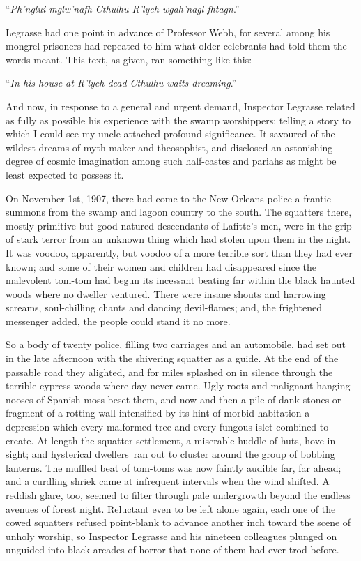 ``\emph{Ph'nglui mglw'nafh Cthulhu R'lyeh wgah'nagl fhtagn}.''

Legrasse had one point in advance of Professor Webb, for several among
his mongrel prisoners had repeated to him what older celebrants had told
them the words meant. This text, as given, ran something like this:

``\emph{In his house at R'lyeh dead Cthulhu waits dreaming}.''

And now, in response to a general and urgent demand, Inspector Legrasse
related as fully as possible his experience with the swamp worshippers;
telling a story to which I could see my uncle attached profound
significance. It savoured of the wildest dreams of myth-maker and
theosophist, and disclosed an astonishing degree of cosmic imagination
among such half-castes and pariahs as might be least expected to possess
it.

\pagebreak

On November 1st, 1907, there had come to the New Orleans police a
frantic summons from the swamp and lagoon country to the south. The
squatters there, mostly primitive but good-natured descendants of
Lafitte's men, were in the grip of stark terror from an unknown thing
which had stolen upon them in the night. It was voodoo, apparently, but
voodoo of a more terrible sort than they had ever known; and some of
their women and children had disappeared since the malevolent tom-tom
had begun its incessant beating far within the black haunted woods where
no dweller ventured. There were insane shouts and harrowing screams,
soul-chilling chants and dancing devil-flames; and, the frightened
messenger added, the people could stand it no more.

So a body of twenty police, filling two carriages and an automobile, had
set out in the late afternoon with the shivering squatter as a guide. At
the end of the passable road they alighted, and for miles splashed on in
silence through the terrible cypress woods where day never came. Ugly
roots and malignant hanging nooses of Spanish moss beset them, and now
and then a pile of dank stones or fragment of a rotting wall intensified
by its hint of morbid habitation a depression which every malformed tree
and every fungous islet combined to create. At length the squatter
settlement, a miserable huddle of huts, hove in sight; and hysterical
dwellers\est\ ran out to cluster around the group of bobbing lanterns. The
muffled beat of tom-toms was now faintly audible far, far ahead; and a
curdling shriek came at infrequent intervals when the wind shifted. A
reddish glare, too, seemed to filter through pale undergrowth beyond the
endless avenues of forest night. Reluctant even to be left alone again,
each one of the cowed squatters refused point-blank to advance another
inch toward the scene of unholy worship, so Inspector Legrasse and his
nineteen colleagues plunged on unguided into black arcades of horror
that none of them had ever trod before.

